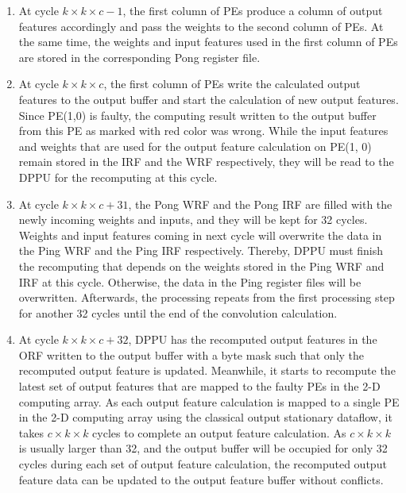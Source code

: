 \begin{enumerate}
    \item At cycle $k\times k\times c - 1$, the first column of PEs produce a column of output features accordingly and pass the weights to the second column of PEs. At the same time, the weights and input features used in the first column of PEs are stored in the corresponding Pong register file.

    \item At cycle $ k\times k\times c $, the first column of PEs write the calculated output features to the output buffer and start the calculation of new output features. Since PE(1,0) is faulty, the computing result written to the output buffer from this PE as marked with red color was wrong. While the input features and weights that are used for the output feature calculation on PE(1, 0) remain stored in the IRF and the WRF respectively, they will be read to the DPPU for the recomputing at this cycle. 

    \item At cycle $ k\times k\times c + 31$, the Pong WRF and the Pong IRF are filled with the newly incoming weights and inputs, and they will be kept for 32 cycles. Weights and input features coming in next cycle will overwrite the data in the Ping WRF and the Ping IRF respectively. Thereby, DPPU must finish the recomputing that depends on the weights stored in the Ping WRF and IRF at this cycle. Otherwise, the data in the Ping register files will be overwritten. Afterwards, the processing repeats from the first processing step for another 32 cycles until the end of the convolution calculation.

    \item At cycle $ k\times k\times c + 32$, DPPU has the recomputed output features in the ORF written to the output buffer with a byte mask such that only the recomputed output feature is updated. Meanwhile, it starts to recompute the latest set of output features that are mapped to the faulty PEs in the 2-D computing array. As each output feature calculation is mapped to a single PE in the 2-D computing array using the classical output stationary dataflow, it takes $c \times k \times k$ cycles to complete an output feature calculation. As $c \times k \times k$ is usually larger than 32, and the output buffer will be occupied for only 32 cycles during each set of output feature calculation, the recomputed output feature data can be updated to the output feature buffer without conflicts. %


\end{enumerate}
